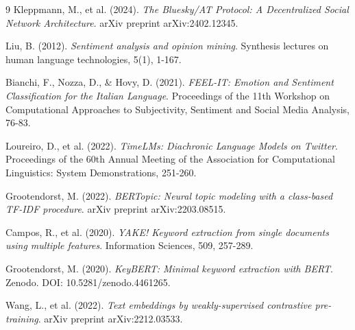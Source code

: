 \documentclass[11pt]{article}
\begin{document}
\newpage
\begin{thebibliography}{9}
Kleppmann, M., et al. (2024). \emph{The Bluesky/AT Protocol: A Decentralized Social Network Architecture}. arXiv preprint arXiv:2402.12345.

Liu, B. (2012). \emph{Sentiment analysis and opinion mining}. Synthesis lectures on human language technologies, 5(1), 1-167.

Bianchi, F., Nozza, D., \& Hovy, D. (2021). \emph{FEEL-IT: Emotion and Sentiment Classification for the Italian Language}. Proceedings of the 11th Workshop on Computational Approaches to Subjectivity, Sentiment and Social Media Analysis, 76-83.

Loureiro, D., et al. (2022). \emph{TimeLMs: Diachronic Language Models on Twitter}. Proceedings of the 60th Annual Meeting of the Association for Computational Linguistics: System Demonstrations, 251-260.

Grootendorst, M. (2022). \emph{BERTopic: Neural topic modeling with a class-based TF-IDF procedure}. arXiv preprint arXiv:2203.08515.

Campos, R., et al. (2020). \emph{YAKE! Keyword extraction from single documents using multiple features}. Information Sciences, 509, 257-289.

Grootendorst, M. (2020). \emph{KeyBERT: Minimal keyword extraction with BERT}. Zenodo. DOI: 10.5281/zenodo.4461265.

Wang, L., et al. (2022). \emph{Text embeddings by weakly-supervised contrastive pre-training}. arXiv preprint arXiv:2212.03533.
\end{thebibliography}
\end{document}
